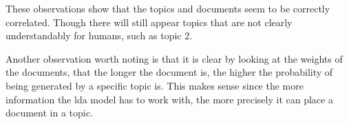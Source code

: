 These observations show that the topics and documents seem to be correctly correlated.
Though there will still appear topics that are not clearly understandably for humans, such as topic 2.

Another observation worth noting is that it is clear by looking at the weights of the documents, that the longer the document is, the higher the probability of being generated by a specific topic is.
This makes sense since the more information the \gls{lda} model has to work with, the more precisely it can place a document in a topic.


